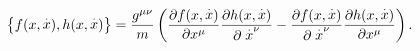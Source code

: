 \begin{equation}
\left\{ f(x,\stackrel{.}{x}),h(x,\stackrel{.}{x})\right\} =\frac{g^{\mu \nu }%
}{m}\left( \frac{\partial f(x,\stackrel{.}{x})}{\partial x^{\mu }}\frac{%
\partial h(x,\stackrel{.}{x})}{\partial \stackrel{.}{x}^{\nu }}-\frac{%
\partial f(x,\stackrel{.}{x})}{\partial \stackrel{.}{x}^{\nu }}\frac{%
\partial h(x,\stackrel{.}{x})}{\partial x^{\mu }}\right) .
\end{equation}

